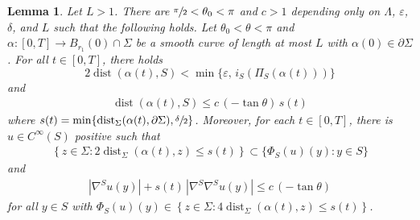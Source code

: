\documentclass[11pt]{amsart}
\newtheorem{lem}[prop]{Lemma}
\begin{document}
	\begin{lem}\label{harnack iteration}
Let   $L>1$.  There are $\sfrac{\pi}2<\theta_0<\pi$ and $c>1$ depending only on $\Lambda$, $\varepsilon$, $\delta$,  and $L$ such that the following holds. Let $\theta_0<\theta<\pi$ and
  $\alpha:[0,T]\to B_{r_1}(0)\cap\Sigma$ be a smooth curve of length at most $L$ with $\alpha(0)\in \partial \Sigma$. For all $t\in[0,T]$, there holds $$2\operatorname{dist}(\alpha(t),S)<\min\{\varepsilon,\,i_S(\Pi_S(\alpha(t)))\}$$ and 
\begin{align} \label{conclusion} 
\operatorname{dist}(\alpha(t),S)\leq c\,(-\tan\theta)\,s(t)
\end{align} 
where $s(t)=\min\{\operatorname{dist}_\Sigma(\alpha(t),\partial \Sigma),\sfrac{\delta}2\}$.
Moreover, for each $t\in[0,T]$, there is  $u\in C^\infty(S)$ positive such that
\begin{align} \label{graph concl 1}
\left\{z\in \Sigma:2\operatorname{dist}_\Sigma(\alpha(t),z)\leq s(t)\right\}\subset \{\Phi_S(u)(y):y\in S\}
\end{align} and
\begin{align} \label{graph concl2}
	|\nabla^Su(y)|+s(t)\,|\nabla^S\nabla^Su(y)|\leq c\,(-\tan\theta)
\end{align}
for all $y\in S$ with $\Phi_S(u)(y)\in \left\{z\in \Sigma:4\operatorname{dist}_\Sigma(\alpha(t),z)\leq s(t)\right\}$.
	\end{lem} 
\end{document}
